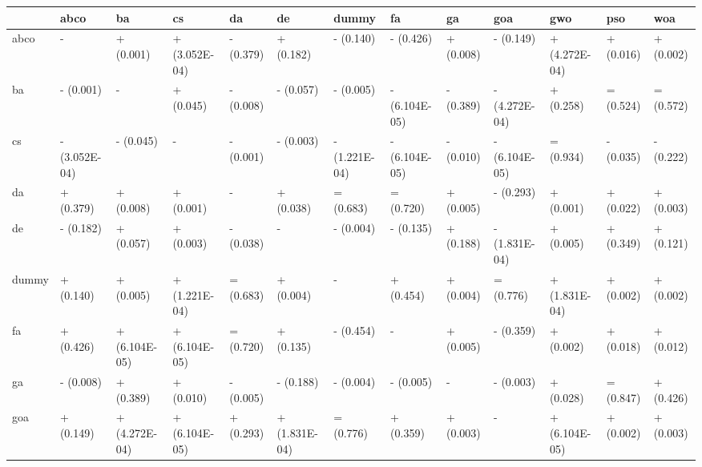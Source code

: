 \begin{table}
    \centering
    \begin{adjustbox}{width=\linewidth}
        \begin{tabular}{lllllllllllll}
            \toprule
            {}    & abco          & ba            & cs            & da        & de            & dummy         & fa            & ga        & goa           & gwo           & pso       & woa       \\
            \midrule
            abco  & -             & + (0.001)     & + (3.052E-04) & - (0.379) & + (0.182)     & - (0.140)     & - (0.426)     & + (0.008) & - (0.149)     & + (4.272E-04) & + (0.016) & + (0.002) \\
            ba    & - (0.001)     & -             & + (0.045)     & - (0.008) & - (0.057)     & - (0.005)     & - (6.104E-05) & - (0.389) & - (4.272E-04) & + (0.258)     & = (0.524) & = (0.572) \\
            cs    & - (3.052E-04) & - (0.045)     & -             & - (0.001) & - (0.003)     & - (1.221E-04) & - (6.104E-05) & - (0.010) & - (6.104E-05) & = (0.934)     & - (0.035) & - (0.222) \\
            da    & + (0.379)     & + (0.008)     & + (0.001)     & -         & + (0.038)     & = (0.683)     & = (0.720)     & + (0.005) & - (0.293)     & + (0.001)     & + (0.022) & + (0.003) \\
            de    & - (0.182)     & + (0.057)     & + (0.003)     & - (0.038) & -             & - (0.004)     & - (0.135)     & + (0.188) & - (1.831E-04) & + (0.005)     & + (0.349) & + (0.121) \\
            dummy & + (0.140)     & + (0.005)     & + (1.221E-04) & = (0.683) & + (0.004)     & -             & + (0.454)     & + (0.004) & = (0.776)     & + (1.831E-04) & + (0.002) & + (0.002) \\
            fa    & + (0.426)     & + (6.104E-05) & + (6.104E-05) & = (0.720) & + (0.135)     & - (0.454)     & -             & + (0.005) & - (0.359)     & + (0.002)     & + (0.018) & + (0.012) \\
            ga    & - (0.008)     & + (0.389)     & + (0.010)     & - (0.005) & - (0.188)     & - (0.004)     & - (0.005)     & -         & - (0.003)     & + (0.028)     & = (0.847) & + (0.426) \\
            goa   & + (0.149)     & + (4.272E-04) & + (6.104E-05) & + (0.293) & + (1.831E-04) & = (0.776)     & + (0.359)     & + (0.003) & -             & + (6.104E-05) & + (0.002) & + (0.003) \\

\end{tabular}
\end{adjustbox}
\end{table}
